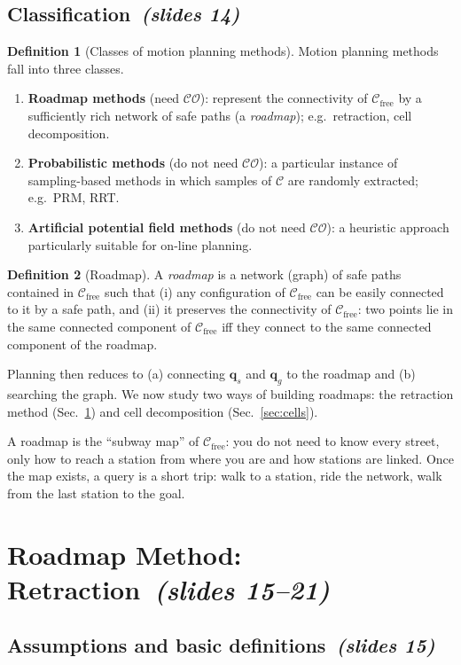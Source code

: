 \documentclass[11pt,a4paper]{article}
\newcommand{\Cspace}{\mathcal{C}}
\newcommand{\Cfree}{\mathcal{C}_{\mathrm{free}}}
\newcommand{\CO}{\mathcal{CO}}
\newcommand{\qs}{\boldsymbol{q}_s}
\newcommand{\qg}{\boldsymbol{q}_g}
\newcommand{\slides}[1]{\emph{(slides #1)}}
\newcommand{\sect}[2]{\section{#1\texorpdfstring{\ \slides{#2}}{ (slides #2)}}}
\newcommand{\subsect}[2]{\subsection{#1\texorpdfstring{\ \slides{#2}}{ (slides #2)}}}
\theoremstyle{definition}
\newtheorem{definition}{Definition}[section]
\theoremstyle{plain}
\theoremstyle{remark}
\begin{document}
\subsect{Classification}{14}

\begin{definition}[Classes of motion planning methods]
Motion planning methods fall into three classes.
\begin{enumerate}
  \item \textbf{Roadmap methods} (need $\CO$): represent the connectivity of $\Cfree$ by a sufficiently rich network of safe paths (a \emph{roadmap}); e.g.\ retraction, cell decomposition.
  \item \textbf{Probabilistic methods} (do not need $\CO$): a particular instance of sampling-based methods in which samples of $\Cspace$ are randomly extracted; e.g.\ PRM, RRT.
  \item \textbf{Artificial potential field methods} (do not need $\CO$): a heuristic approach particularly suitable for on-line planning.
\end{enumerate}
\end{definition}

\begin{definition}[Roadmap]
A \emph{roadmap} is a network (graph) of safe paths contained in $\Cfree$ such that (i) any configuration of $\Cfree$ can be easily connected to it by a safe path, and (ii) it preserves the connectivity of $\Cfree$: two points lie in the same connected component of $\Cfree$ iff they connect to the same connected component of the roadmap.
\end{definition}

Planning then reduces to (a) connecting $\qs$ and $\qg$ to the roadmap and (b) searching the graph. We now study two ways of building roadmaps: the retraction method (Sec.~\ref{sec:retraction}) and cell decomposition (Sec.~\ref{sec:cells}).

\begin{intuition}
A roadmap is the ``subway map'' of $\Cfree$: you do not need to know every street, only how to reach a station from where you are and how stations are linked. Once the map exists, a query is a short trip: walk to a station, ride the network, walk from the last station to the goal.
\end{intuition}

\sect{Roadmap Method: Retraction}{15--21}
\label{sec:retraction}

\subsect{Assumptions and basic definitions}{15}
\end{document}

